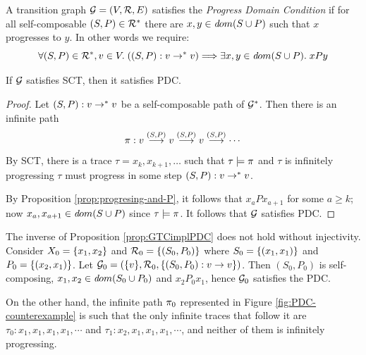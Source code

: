 \begin{definition}\label{def:PDC}
A transition graph $\mathcal{G} = (V,\mathcal{R},E)$ 
satisfies the {\em Progress Domain Condition} 
if for all self-composable $(S,P) \in \mathcal{R}^*$ there are $x, y \in  {\textit dom}( S \cup P )$ such that
$x$ progresses to $y$. In other words we require:
\[\forall (S,P) \in \mathcal{R}^*, v \in V.\; ((S,P) : v \to^* v) \Longrightarrow \exists x, y \in {\textit dom}( S \cup P ).\; x P y \]
\end{definition}



\begin{proposition}\label{prop:GTCimplPDC}
If $\mathcal{G}$ satisfies SCT, then it satisfies PDC.
\end{proposition}

\begin{proof}
Let $(S,P) : v \to^* v$ be a self-composable path of $\mathcal{G}^*$. 
Then there is an infinite path
\[\pi : v \stackrel{(S,P)}{\longrightarrow} v \stackrel{(S,P)}{\longrightarrow} v \stackrel{(S,P)}{\longrightarrow}\cdots\]
By SCT, there is a trace $\tau = x_k, x_{k+1}, \ldots$ such that $\tau\models\pi$ 
and $\tau$ is infinitely progressing
$\tau$ must progress in some step $(S,P) : v \to^* v$.

By Proposition \ref{prop:progresing-and-P}, it follows that $x_a P x_{a+1}$ for some 
$a \ge k$; now $x_a, x_{a+1} \in {\textit dom}( S \cup P )$ since
$\tau\models \pi$. It follows that $\mathcal{G}$ satisfies PDC.
\end{proof}

\begin{remark}\label{rem:PDCnotGTC}
The inverse of Proposition \ref{prop:GTCimplPDC} does not hold without injectivity. 
Consider $X_0 = \{ x_1, x_2 \}$ and $\mathcal{R}_0 = \{ (S_0,P_0) \}$ where
$S_0 = \{ (x_1, x_1) \}$ and $P_0 = \{ (x_2, x_1) \}$. Let $\mathcal{G}_0 = (\{ v \}, \mathcal{R}_0, \{ (S_0,P_0) : v \to v \})$. Then $(S_0,P_0)$
is self-composing, $x_1, x_2 \in {\textit dom}( S_0 \cup P_0 )$ and $x_2 P_0 x_1$, hence $\mathcal{G}_0$ satisfies the PDC.

On the other hand, the infinite path $\pi_0$ represented in Figure \ref{fig:PDC-counterexample} is such that the only infinite traces that follow it are
$\tau_0 : x_1 , x_1, x_1, x_1, \cdots$ and $\tau_1 : x_2, x_1 , x_1, x_1, \cdots$, 
and neither of them is infinitely progressing. 
\end{remark}

